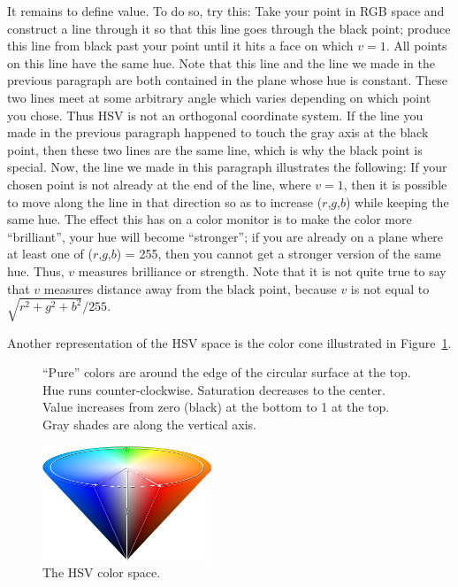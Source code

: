 It remains to define value. To do so, try this:
Take your point in RGB space and construct a line through it so that
this line goes through the black point; produce this line from black
past your point until it hits a face on which $v = 1$.  All points
on this line have the same hue.  Note that this line and the line we
made in the previous paragraph are both contained in the plane whose
hue is constant.  These two lines meet at some arbitrary
angle which varies depending on which point you chose.  Thus HSV is
not an orthogonal coordinate system.  If the line you made in the
previous paragraph happened to touch the gray axis at the black point,
then these two lines are the same line, which is why the black point
is special.  Now, the line we made in this paragraph illustrates the
following:  If your chosen point is not already at the end of the
line, where $v = 1$, then it is possible to move along the line in
that direction so as to increase ($r$,$g$,$b$) while keeping the
same hue.  The effect this has on a color monitor is to make the
color more ``brilliant'', your hue will become ``stronger''; if you are already on a plane where
at least one of ($r$,$g$,$b$) = 255, then you cannot get a stronger
version of the same hue.  Thus, $v$ measures brilliance or strength.  Note that
it is not quite true to say that $v$ measures distance away from
the black point, because $v$ is not equal to $\sqrt{r^2 + g^2 + b^2}/255$.

Another representation of the HSV space is the color cone illustrated in Figure~\ref{fig:hsv-cone}.

\begin{figure}[h]
   \parbox[b]{0.54\textwidth}{``Pure'' colors are around the edge of the circular surface at the top. Hue runs counter-clockwise. Saturation decreases to the center. Value increases from zero (black) at the bottom to 1 at the top. Gray shades are along the vertical axis.}%
   \hfill%
   \includegraphics[width=0.45\textwidth,bb=0 0 750 508]{fig/hsv-cone.png}%
   \caption{The HSV color space.}
   \label{fig:hsv-cone}
\end{figure}

